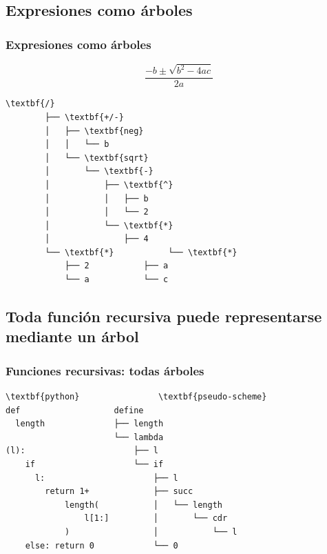 \documentclass[xcolor=x11names,compress]{beamer}
\renewcommand{\(}{\begin{columns}}
\renewcommand{\)}{\end{columns}}
\newcommand{\<}[1]{\begin{column}{#1}}
\renewcommand{\>}{\end{column}}
\begin{document}

\subsection{Expresiones como árboles}
\begin{frame}[fragile]
    \frametitle{Expresiones como árboles}
    $$\frac{-b\pm\sqrt{b^2-4ac}}{2a}$$

\begin{Verbatim}[commandchars=\\\{\},codes={\catcode`$=3\catcode`_=8}]
        \textbf{/}
        ├── \textbf{+/-}
        │   ├── \textbf{neg}
        │   │   └── b
        │   └── \textbf{sqrt}
        │       └── \textbf{-}
        │           ├── \textbf{^}
        │           │   ├── b
        │           │   └── 2
        │           └── \textbf{*}
        │               ├── 4
        └── \textbf{*}           └── \textbf{*}
            ├── 2           ├── a
            └── a           └── c
\end{Verbatim}
\end{frame}



\subsection{Toda función recursiva puede representarse mediante un árbol}
\begin{frame}[fragile]
    \frametitle{Funciones recursivas: todas árboles}
    \codeLengthRecursionSmall
\begin{Verbatim}[commandchars=\\\{\},codes={\catcode`$=3\catcode`_=8}]
\textbf{python}                \textbf{pseudo-scheme}
def                   define                    
  length              ├── length                
                      └── lambda                
(l):                      ├── l                 
    if                    └── if                
      l:                      ├── l             
        return 1+             ├── succ          
            length(           │   └── length    
                l[1:]         │       └── cdr   
            )                 │           └── l 
    else: return 0            └── 0             
\end{Verbatim}
\end{frame}
\end{document}
